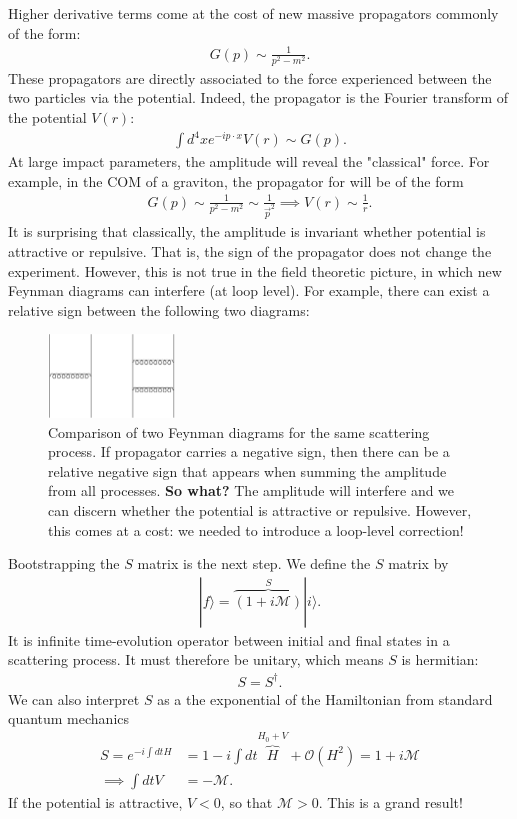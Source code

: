 \documentclass[11pt,a4paper]{article}
\begin{document}
Higher derivative terms come at the cost of new massive propagators commonly of the form:
\begin{align*}
	G(p) \sim \frac{1}{p^2 - m^2}.
\end{align*}
These propagators are directly associated to the force experienced between the two particles via the potential.  Indeed, the propagator is the Fourier transform of the potential $V(r)$:
\begin{align*}
	\int d^4 x e^{-ip\cdot x}V(r) \sim G(p).
\end{align*}
At large impact parameters, the amplitude will reveal the "classical" force.  For example, in the COM of a graviton, the propagator for will be of the form
\begin{align*}
	G(p) \sim \frac{1}{p^2 - m^2} \sim \frac{1}{\vec{p}^2} \implies V(r) \sim \frac{1}{r}.
\end{align*}
It is surprising that classically, the amplitude is invariant whether potential is attractive or repulsive.  That is, the sign of the propagator does not change the experiment.  However, this is not true in the field theoretic picture, in which new Feynman diagrams can interfere (at loop level).  For example, there can exist a relative sign between the following two diagrams:

\begin{figure}[ht]
    \centering
    \includegraphics[width=0.3\textwidth]{figures/relative_sign.pdf}
    \caption{Comparison of two Feynman diagrams for the same scattering process.  If propagator carries a negative sign, then there can be a relative negative sign that appears when summing the amplitude from all processes. \textbf{So what?}  The amplitude will interfere and we can discern whether the potential is attractive or repulsive.  However, this comes at a cost: we needed to introduce a loop-level correction!}
    \label{fig:mesh1}
\end{figure}

Bootstrapping the $S$ matrix is the next step.  We define the $S$ matrix by
\begin{align*}
	|f\rangle = \overbrace{(1 + i \mathcal M)}^{S} |i\rangle.
\end{align*}
It is infinite time-evolution operator between initial and final states in a scattering process.  It must therefore be unitary, which means $S$ is hermitian:
\begin{align*}
	S = S^{\dagger}.
\end{align*}
We can also interpret $S$ as a the exponential of the Hamiltonian from standard quantum mechanics
\begin{align*}
S = e^{-i \int dt H} & = 1 - i \int dt \overbrace{H}^{H_0 + V} + \mathcal{O}(H^2) = 1 + i \mathcal{M}\\
\implies \int dt V & = - \mathcal{M}.
\end{align*}
If the potential is attractive, $V < 0$, so that $\mathcal{M} > 0$.  This is a grand result!
\end{document}
